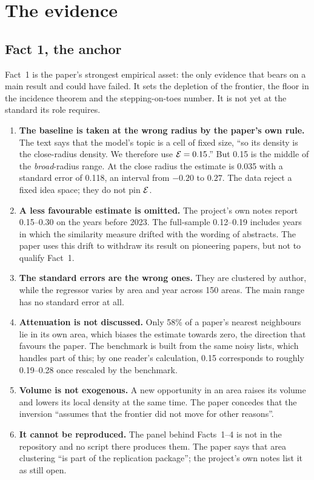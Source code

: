 \section{The evidence}\label{sec:crit-evidence}

\subsection{Fact 1, the anchor}

Fact~1 is the paper's strongest empirical asset: the only evidence that bears on a main result and could have failed. It sets the depletion of the frontier, the floor in the incidence theorem and the stepping-on-toes number. It is not yet at the standard its role requires.

\begin{enumerate}
\item \textbf{The baseline is taken at the wrong radius by the paper's own rule.} The text says that the model's topic is a cell of fixed size, ``so its density is the close-radius density. We therefore use $\mathcal{E}=0.15$.'' But 0.15 is the middle of the \emph{broad}-radius range. At the close radius the estimate is 0.035 with a standard error of 0.118, an interval from $-0.20$ to $0.27$. The data reject a fixed idea space; they do not pin $\mathcal{E}$.
\item \textbf{A less favourable estimate is omitted.} The project's own notes report 0.15--0.30 on the years before 2023. The full-sample 0.12--0.19 includes years in which the similarity measure drifted with the wording of abstracts. The paper uses this drift to withdraw its result on pioneering papers, but not to qualify Fact~1.
\item \textbf{The standard errors are the wrong ones.} They are clustered by author, while the regressor varies by area and year across 150 areas. The main range has no standard error at all.
\item \textbf{Attenuation is not discussed.} Only 58\% of a paper's nearest neighbours lie in its own area, which biases the estimate towards zero, the direction that favours the paper. The benchmark is built from the same noisy lists, which handles part of this; by one reader's calculation, 0.15 corresponds to roughly 0.19--0.28 once rescaled by the benchmark.
\item \textbf{Volume is not exogenous.} A new opportunity in an area raises its volume and lowers its local density at the same time. The paper concedes that the inversion ``assumes that the frontier did not move for other reasons''.
\item \textbf{It cannot be reproduced.} The panel behind Facts~1--4 is not in the repository and no script there produces them. The paper says that area clustering ``is part of the replication package''; the project's own notes list it as still open.
\end{enumerate}

